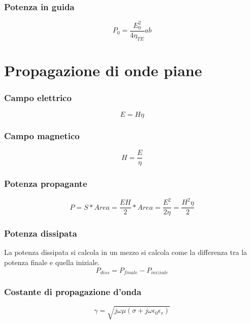\documentclass[10pt,a4paper]{report}
\begin{document}
			\subsection{Potenza in guida}
				\begin{equation}
				P_0=\frac{E_0^2}{4\eta_{TE}}ab
				\end{equation}

\chapter{Propagazione di onde piane}

	\subsection{Campo elettrico}

		\begin{equation}
		E=H\eta
		\label{eq:campo-elettrico}
		\end{equation}
		

	\subsection{Campo magnetico}
		\begin{equation}
		H=\frac{E}{\eta}
		\label{eq:campo-magnetico}
		\end{equation}
	

	\subsection{Potenza propagante}


		\begin{equation}
		P=S*Area=\frac{EH}{2}*Area=\frac{E^2}{2\eta}=\frac{H^2\eta}{2}
		\label{eq:potenza-propagante}
		\end{equation}
	
	\subsection{Potenza dissipata}

		La potenza dissipata si calcola in un mezzo si calcola come la differenza tra la potenza finale e quella iniziale.
		\begin{equation}
			P_{diss}=P_{finale}-P_{iniziale}
			\label{eq:potenza-dissipata}
		\end{equation}
	
	\subsection{Costante di propagazione d'onda}
		\[
		\gamma=\sqrt{j\omega\mu(\sigma+j\omega\epsilon_0\epsilon_r)}
		\]
\end{document}
